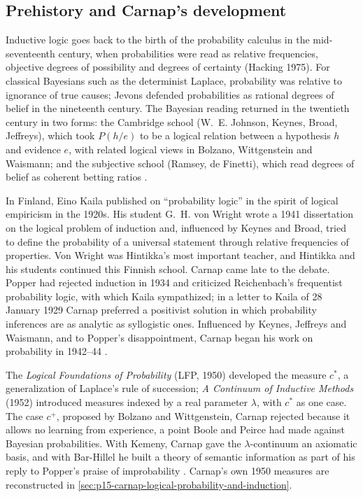 \subsection{Prehistory and Carnap's development}
\label{sec:p15-w02b-p15-030-nn-prehistory}

Inductive logic goes back to the birth of the probability calculus in
the mid-seventeenth century, when probabilities were read as relative
frequencies, objective degrees of possibility and degrees of certainty
(Hacking 1975). For classical Bayesians such as the determinist Laplace,
probability was relative to ignorance of true causes; Jevons defended
probabilities as rational degrees of belief in the nineteenth century.
The Bayesian reading returned in the twentieth century in two forms: the
Cambridge school (W.~E. Johnson, Keynes, Broad, Jeffreys), which took
\(P(h/e)\) to be a logical relation between a hypothesis \(h\) and
evidence \(e\), with related logical views in Bolzano, Wittgenstein and
Waismann; and the subjective school (Ramsey, de Finetti), which read
degrees of belief as coherent betting ratios
\cite[p.~312]{Niiniluoto2011HintikkaProgramReading}.

In Finland, Eino Kaila published on ``probability logic'' in the spirit
of logical empiricism in the 1920s. His student G.~H. von Wright wrote a
1941 dissertation on the logical problem of induction and, influenced by
Keynes and Broad, tried to define the probability of a universal
statement through relative frequencies of properties. Von Wright was
Hintikka's most important teacher, and Hintikka and his students
continued this Finnish school. Carnap came late to the debate. Popper had
rejected induction in 1934 and criticized Reichenbach's frequentist
probability logic, with which Kaila sympathized; in a letter to Kaila of
28 January 1929 Carnap preferred a positivist solution in which
probability inferences are as analytic as syllogistic ones. Influenced
by Keynes, Jeffreys and Waismann, and to Popper's disappointment, Carnap
began his work on probability in 1942--44
\cite[p.~312]{Niiniluoto2011HintikkaProgramReading}.

The \emph{Logical Foundations of Probability} (LFP, 1950) developed the
measure \(c^*\), a generalization of Laplace's rule of succession; \emph{A
Continuum of Inductive Methods} (1952) introduced measures indexed by a
real parameter \(\lambda\), with \(c^*\) as one case. The case \(c^+\),
proposed by Bolzano and Wittgenstein, Carnap rejected because it allows
no learning from experience, a point Boole and Peirce had made against
Bayesian probabilities. With Kemeny, Carnap gave the
\(\lambda\)-continuum an axiomatic basis, and with Bar-Hillel he built a
theory of semantic information as part of his reply to Popper's praise of
improbability \cite[pp.~312--313]{Niiniluoto2011HintikkaProgramReading}.
Carnap's own 1950 measures are reconstructed in
\cref{sec:p15-carnap-logical-probability-and-induction}.

